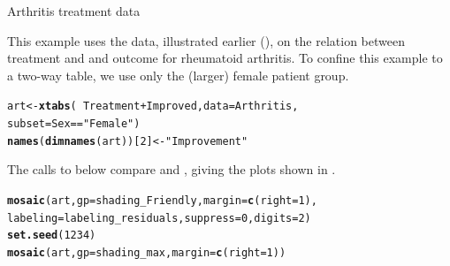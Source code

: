 \documentclass[11pt]{book}\usepackage[]{graphicx}\usepackage[]{color}
\makeatletter
\newcommand{\hlnum}[1]{\textcolor[rgb]{0.686,0.059,0.569}{#1}}%
\newcommand{\hlstr}[1]{\textcolor[rgb]{0.192,0.494,0.8}{#1}}%
\newcommand{\hlopt}[1]{\textcolor[rgb]{0,0,0}{#1}}%
\newcommand{\hlstd}[1]{\textcolor[rgb]{0.345,0.345,0.345}{#1}}%
\newcommand{\hlkwb}[1]{\textcolor[rgb]{0.69,0.353,0.396}{#1}}%
\newcommand{\hlkwc}[1]{\textcolor[rgb]{0.333,0.667,0.333}{#1}}%
\newcommand{\hlkwd}[1]{\textcolor[rgb]{0.737,0.353,0.396}{\textbf{#1}}}%
\newenvironment{kframe}{%
 \def\at@end@of@kframe{}%
 \ifinner\ifhmode%
  \def\at@end@of@kframe{\end{minipage}}%
  \begin{minipage}{\columnwidth}%
 \fi\fi%
 \def\FrameCommand##1{\hskip\@totalleftmargin \hskip-\fboxsep
 \colorbox{shadecolor}{##1}\hskip-\fboxsep
     \hskip-\linewidth \hskip-\@totalleftmargin \hskip\columnwidth}%
 \MakeFramed {\advance\hsize-\width
   \@totalleftmargin\z@ \linewidth\hsize
   \@setminipage}}%
 {\par\unskip\endMakeFramed%
 \at@end@of@kframe}
\newenvironment{knitrout}{}{} %
\renewenvironment{knitrout}{\small\renewcommand{\baselinestretch}{.85}}{} %
\makeatother
\begin{document}
\begin{Example}{Arthritis treatment data}

This example uses the  data, illustrated earlier (),
on the relation between treatment and and outcome for rheumatoid arthritis.
To confine this example to a two-way table, we use only the (larger) female
patient group.
\begin{knitrout}
\color{fgcolor}\begin{kframe}
\begin{alltt}
\hlstd{art} \hlkwb{<-} \hlkwd{xtabs}\hlstd{(}\hlopt{~} \hlstd{Treatment} \hlopt{+} \hlstd{Improved,} \hlkwc{data} \hlstd{= Arthritis,}
             \hlkwc{subset} \hlstd{= Sex} \hlopt{==} \hlstr{"Female"}\hlstd{)}
\hlkwd{names}\hlstd{(}\hlkwd{dimnames}\hlstd{(art))[}\hlnum{2}\hlstd{]} \hlkwb{<-} \hlstr{"Improvement"}
\end{alltt}
\end{kframe}
\end{knitrout}

The calls to  below compare  and ,
giving the plots shown in .

\begin{knitrout}
\color{fgcolor}\begin{kframe}
\begin{alltt}
\hlkwd{mosaic}\hlstd{(art,} \hlkwc{gp}\hlstd{=shading_Friendly,} \hlkwc{margin} \hlstd{=} \hlkwd{c}\hlstd{(}\hlkwc{right} \hlstd{=} \hlnum{1}\hlstd{),}
       \hlkwc{labeling}\hlstd{=labeling_residuals,} \hlkwc{suppress}\hlstd{=}\hlnum{0}\hlstd{,} \hlkwc{digits}\hlstd{=}\hlnum{2}\hlstd{)}
\hlkwd{set.seed}\hlstd{(}\hlnum{1234}\hlstd{)}
\hlkwd{mosaic}\hlstd{(art,} \hlkwc{gp}\hlstd{=shading_max,} \hlkwc{margin} \hlstd{=} \hlkwd{c}\hlstd{(}\hlkwc{right} \hlstd{=} \hlnum{1}\hlstd{))}
\end{alltt}
\end{kframe}\begin{figure}[htbp]



\end{figure}
\end{knitrout}
\end{Example}
\end{document}
